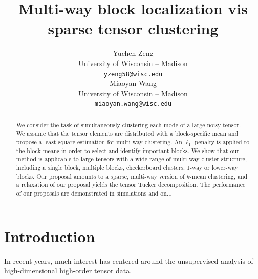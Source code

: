 \documentclass{article}
\title{Multi-way block localization vis sparse tensor clustering}
\author{%
Yuchen Zeng \\
 University of Wisconsin -- Madison\\
 \texttt{yzeng58@wisc.edu} \\
\And
Miaoyan Wang \\
 University of Wisconsin -- Madison\\
\texttt{miaoyan.wang@wisc.edu} \\
}
\begin{document}
\maketitle

\begin{abstract}
We consider the task of simultaneously clustering each mode of a large noisy tensor. We assume that the tensor elements are distributed with a block-specific mean and propose a least-square estimation for multi-way clustering. An $\ell_1$ penalty is applied to the block-means in order to select and identify important blocks. We show that our method is applicable to large tensors with a wide range of multi-way cluster structure, including a single block, multiple blocks, checkerboard clusters, 1-way or lower-way blocks. Our proposal amounts to a sparse, multi-way version of $k$-mean clustering, and a relaxation of our proposal yields the tensor Tucker decomposition. The performance of our proposals are demonstrated in simulations and on... 
\end{abstract}

\section{Introduction}
In recent years, much interest has centered around the unsupervised analysis of high-dimensional high-order tensor data. 
\end{document}
